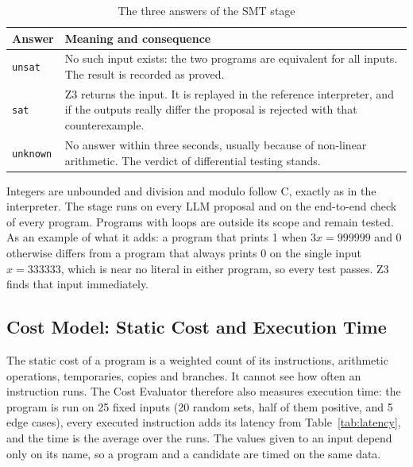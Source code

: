 \documentclass[12pt,a4paper]{report}
\begin{document}
\begin{table}[H]
\centering
\caption{The three answers of the SMT stage}
\label{tab:smt}
\begin{tabularx}{\textwidth}{|l|X|}
\hline
\textbf{Answer} & \textbf{Meaning and consequence} \\
\hline
\texttt{unsat} & No such input exists: the two programs are equivalent for all inputs. The result is recorded as proved. \\
\hline
\texttt{sat} & Z3 returns the input. It is replayed in the reference interpreter, and if the outputs really differ the proposal is rejected with that counterexample. \\
\hline
\texttt{unknown} & No answer within three seconds, usually because of non-linear arithmetic. The verdict of differential testing stands. \\
\hline
\end{tabularx}
\end{table}

Integers are unbounded and division and modulo follow C, exactly as in the interpreter. The stage runs on every LLM proposal and on the end-to-end check of every program. Programs with loops are outside its scope and remain tested. As an example of what it adds: a program that prints 1 when $3x = 999999$ and 0 otherwise differs from a program that always prints 0 on the single input $x = 333333$, which is near no literal in either program, so every test passes. Z3 finds that input immediately.

\subsection{Cost Model: Static Cost and Execution Time}
\label{sec:time}

The static cost of a program is a weighted count of its instructions, arithmetic operations, temporaries, copies and branches. It cannot see how often an instruction runs. The Cost Evaluator therefore also measures execution time: the program is run on 25 fixed inputs (20 random sets, half of them positive, and 5 edge cases), every executed instruction adds its latency from Table~\ref{tab:latency}, and the time is the average over the runs. The values given to an input depend only on its name, so a program and a candidate are timed on the same data.
\end{document}
